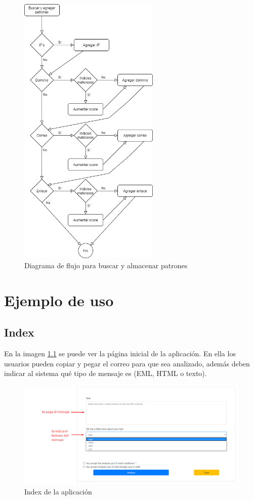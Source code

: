 \begin{figure}[htb]
    \centering
    \includegraphics[width=0.6\textwidth]{imagenes/DiagramasFlujo/Buscar_agregar_patrones.png}
\caption{Diagrama de flujo para buscar y almacenar patrones}
\label{fig:patrones}
\end{figure}

\chapter{Ejemplo de uso} \label{capturas}
\section{Index}
En la imagen \ref{fig:index} se puede ver la página inicial de la aplicación. 
En ella los usuarios pueden copiar y pegar el correo para que sea analizado, además deben indicar al sistema qué tipo de mensaje es (EML, HTML o texto).
\begin{figure}[htb]
    \centering
    \includegraphics[width=\textwidth]{imagenes/capturasAplicacion/Analizar_mensaje.png}
\caption{Index de la aplicación}
\label{fig:index}
\end{figure}

